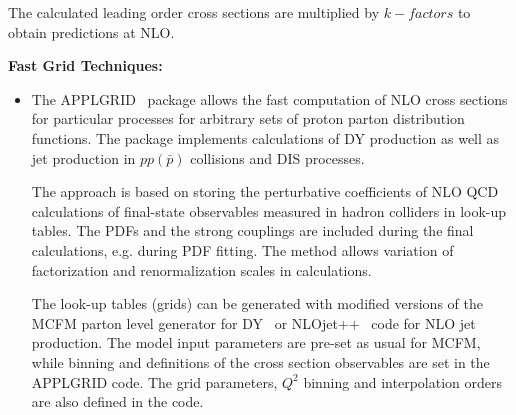 \begin{description}
\begin{itemize}
The calculated leading order cross sections are multiplied by
$k-factors$ to obtain predictions at NLO.

\end{itemize}



\item \bf {Fast Grid Techniques:} \rm


\begin{itemize}
\item The APPLGRID~\cite{Carli:2010rw} package allows the fast computation 
of NLO cross sections for particular processes for arbitrary sets of 
proton parton distribution functions. The package implements
calculations of DY production as well as jet production in $pp(\bar p)$
collisions and DIS processes. 

The approach is based on storing the perturbative coefficients
of NLO QCD calculations of final-state observables measured
in hadron colliders in look-up tables. The PDFs and the 
strong couplings are included during the final calculations,
e.g. during PDF fitting. The method allows 
variation of factorization and renormalization scales in
calculations.

The look-up tables (grids) can be generated with modified versions
of the MCFM parton level generator for DY~\cite{Campbell:1999ah,Campbell:2000je,Campbell:2010ff} 
or NLOjet++~\cite{Nagy:1998bb,Nagy:2001fj} code for NLO jet production.
The model input parameters are pre-set as usual for MCFM, 
while binning and definitions of the
cross section observables are set in the APPLGRID code.
%
The grid parameters, \(Q^2\) binning
and interpolation orders are also defined in the code.


\end{itemize}
\end{description}
